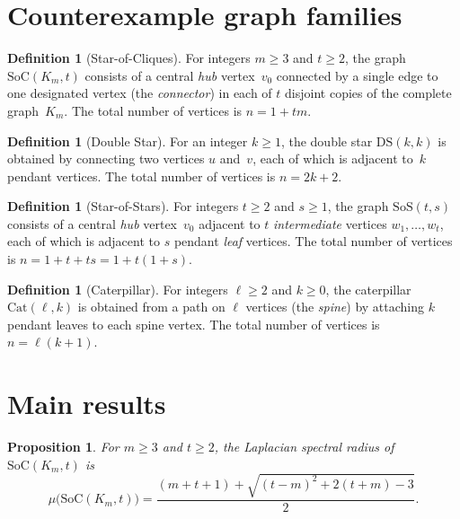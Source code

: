\documentclass[preprint,12pt]{elsarticle}
\newtheorem{proposition}[theorem]{Proposition}
\theoremstyle{definition}
\newtheorem{definition}[theorem]{Definition}
\theoremstyle{remark}
\newcommand{\SoC}{\mathrm{SoC}}       %
\newcommand{\SoS}{\mathrm{SoS}}       %
\newcommand{\DS}{\mathrm{DS}}          %
\newcommand{\Cat}{\mathrm{Cat}}        %
\newcommand{\Lspec}{\mu}               %
\begin{document}
\section{Counterexample graph families}\label{sec:families}

\begin{definition}[Star-of-Cliques]\label{def:soc}
  For integers $m \geq 3$ and $t \geq 2$, the graph
  $\SoC(K_m, t)$ consists of a central \emph{hub} vertex~$v_0$
  connected by a single edge to one designated vertex (the
  \emph{connector}) in each of $t$ disjoint copies of the complete
  graph~$K_m$. The total number of vertices is $n = 1 + tm$.
\end{definition}

\begin{definition}[Double Star]\label{def:ds}
  For an integer $k \geq 1$, the double star $\DS(k,k)$ is obtained by
  connecting two vertices $u$ and~$v$, each of which is adjacent
  to~$k$ pendant vertices. The total number of vertices is $n = 2k + 2$.
\end{definition}

\begin{definition}[Star-of-Stars]\label{def:sos}
  For integers $t \geq 2$ and $s \geq 1$, the graph $\SoS(t, s)$
  consists of a central \emph{hub} vertex~$v_0$ adjacent to $t$
  \emph{intermediate} vertices $w_1, \ldots, w_t$, each of which is
  adjacent to $s$ pendant \emph{leaf} vertices. The total number of
  vertices is $n = 1 + t + ts = 1 + t(1 + s)$.
\end{definition}

\begin{definition}[Caterpillar]\label{def:cat}
  For integers $\ell \geq 2$ and $k \geq 0$, the caterpillar
  $\Cat(\ell, k)$ is obtained from a path on $\ell$ vertices (the
  \emph{spine}) by attaching $k$ pendant leaves to each spine vertex.
  The total number of vertices is $n = \ell(k + 1)$.
\end{definition}


\section{Main results}\label{sec:main}


\begin{proposition}\label{prop:mu-soc}
  For $m \geq 3$ and $t \geq 2$, the Laplacian spectral radius of
  $\SoC(K_m, t)$ is
  \begin{equation}\label{eq:mu-soc}
    \Lspec\bigl(\SoC(K_m, t)\bigr) =
    \frac{(m+t+1) + \sqrt{(t-m)^2 + 2(t+m) - 3}}{2}.
  \end{equation}
\end{proposition}
\end{document}
